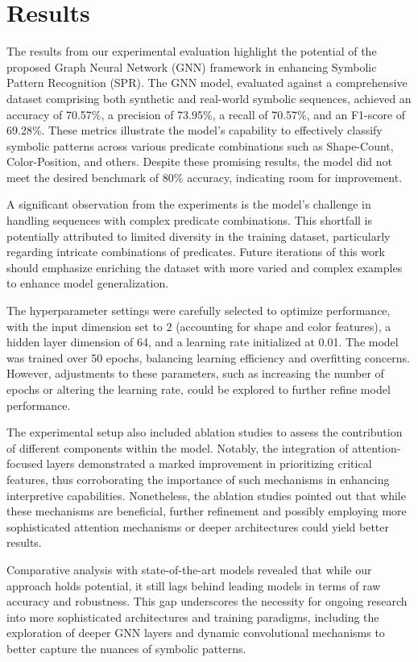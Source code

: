 \documentclass{article}
\begin{document}
\section{Results}
The results from our experimental evaluation highlight the potential of the proposed Graph Neural Network (GNN) framework in enhancing Symbolic Pattern Recognition (SPR). The GNN model, evaluated against a comprehensive dataset comprising both synthetic and real-world symbolic sequences, achieved an accuracy of 70.57\%, a precision of 73.95\%, a recall of 70.57\%, and an F1-score of 69.28\%. These metrics illustrate the model's capability to effectively classify symbolic patterns across various predicate combinations such as Shape-Count, Color-Position, and others. Despite these promising results, the model did not meet the desired benchmark of 80\% accuracy, indicating room for improvement.

A significant observation from the experiments is the model’s challenge in handling sequences with complex predicate combinations. This shortfall is potentially attributed to limited diversity in the training dataset, particularly regarding intricate combinations of predicates. Future iterations of this work should emphasize enriching the dataset with more varied and complex examples to enhance model generalization.

The hyperparameter settings were carefully selected to optimize performance, with the input dimension set to 2 (accounting for shape and color features), a hidden layer dimension of 64, and a learning rate initialized at 0.01. The model was trained over 50 epochs, balancing learning efficiency and overfitting concerns. However, adjustments to these parameters, such as increasing the number of epochs or altering the learning rate, could be explored to further refine model performance.

The experimental setup also included ablation studies to assess the contribution of different components within the model. Notably, the integration of attention-focused layers demonstrated a marked improvement in prioritizing critical features, thus corroborating the importance of such mechanisms in enhancing interpretive capabilities. Nonetheless, the ablation studies pointed out that while these mechanisms are beneficial, further refinement and possibly employing more sophisticated attention mechanisms or deeper architectures could yield better results.

Comparative analysis with state-of-the-art models revealed that while our approach holds potential, it still lags behind leading models in terms of raw accuracy and robustness. This gap underscores the necessity for ongoing research into more sophisticated architectures and training paradigms, including the exploration of deeper GNN layers and dynamic convolutional mechanisms to better capture the nuances of symbolic patterns.
\end{document}
